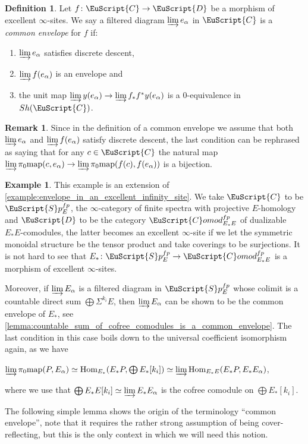\documentclass[oneside,a4paper]{amsart}
\newcommand{\euscr}[1]{\EuScript{#1}} %
\newcommand{\ccat}{\euscr{C}} %
\newcommand{\dcat}{\euscr{D}} %
\newcommand{\Hom}{\textnormal{Hom}} %
\newcommand{\map}{\textnormal{map}} %
\newcommand{\spectra}{\euscr{S}p} %
\newcommand{\spectrafp}{\spectra_{E}^{fp}} %
\newcommand{\Comod}{\euscr{C}omod} %
\newcommand{\ComodE}{\Comod_{E_{*}E}} %
\theoremstyle{plain}
\theoremstyle{definition}
\newtheorem{example}[thm]{Example}
\newtheorem{defin}[thm]{Definition}
\newtheorem{rem}[thm]{Remark}
\theoremstyle{remark}
\begin{document}
\begin{defin}
\label{defin:common_envelope_for_a_morphism_of_excellent_infty_sites}
Let $f \colon \ccat \rightarrow \dcat$ be a morphism of excellent $\infty$-sites. We say a filtered diagram $\varinjlim e_{\alpha}$ in $\ccat$ is a \emph{common envelope} for $f$ if: 

\begin{enumerate}
\item $\varinjlim e_{\alpha}$ satisfies discrete descent,
\item $\varinjlim f(e_{\alpha})$ is an envelope and 
\item the unit map $\varinjlim y(e_{\alpha}) \rightarrow \varinjlim f_{*} f^{*} y(e_{\alpha})$ is a $0$-equivalence in $Sh(\ccat)$. 
\end{enumerate}
\end{defin}

\begin{rem}
\label{rem:last_condition_in_the_definition_of_a_common_envelope}
Since in the definition of a common envelope we assume that both $\varinjlim e_{\alpha}$ and $\varinjlim f(e_{\alpha})$ satisfy discrete descent, the last condition can be rephrased as saying that for any $c \in \ccat$ the natural map $\varinjlim \pi_{0} \map(c, e_{\alpha}) \rightarrow \varinjlim \pi_{0} \map(f(c), f(e_{\alpha}))$ is a bijection. 
\end{rem}

\begin{example}
\label{example:countable_sum_of_e_a_common_envelope}
This example is an extension of \cref{example:envelope_in_an_excellent_infinity_site}. We take $\ccat$ to be $\spectrafp$, the $\infty$-category of finite spectra with projective $E$-homology and $\dcat$ to be the category $\ComodE^{fp}$ of dualizable $E_{*}E$-comodules, the latter becomes an excellent $\infty$-site if we let the symmetric monoidal structure be the tensor product and take coverings to be surjections. It is not hard to see that $E_{*} \colon \spectrafp \rightarrow \ComodE^{fp}$ is a morphism of excellent $\infty$-sites. 

Moreover, if $\varinjlim E_{\alpha}$ is a filtered diagram in $\spectrafp$ whose colimit is a countable direct sum $\bigoplus \Sigma^{k_{i}} E$, then $\varinjlim E_{\alpha}$ can be shown to be the common envelope of $E_{*}$, see \cref{lemma:countable_sum_of_cofree_comodules_is_a_common_envelope}. The last condition in this case boils down to the universal coefficient isomorphism again, as we have

\begin{center}
$\varinjlim \pi_{0} \map(P, E_{\alpha}) \simeq \Hom_{E_{*}}(E_{*}P, \bigoplus E_{*}[k_{i}]) \simeq \varinjlim \Hom_{E_{*}E}(E_{*}P, E_{*}E_{\alpha})$,
\end{center}
where we use that $\bigoplus E_{*}E[k_{i}] \simeq \varinjlim E_{*}E_{\alpha}$ is the cofree comodule on $\bigoplus E_{*}[k_{i}]$. 
\end{example}
The following simple lemma shows the origin of the terminology ``common envelope'', note that it requires the rather strong assumption of being cover-reflecting, but this is the only context in which we will need this notion.
\end{document}
